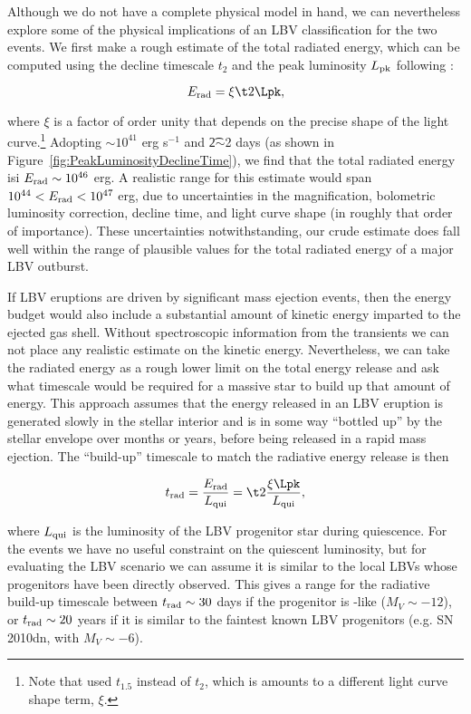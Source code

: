 Although we do not have a complete physical model in hand, we can
nevertheless explore some of the physical implications of an LBV
classification for the two \spock events.  We first make a rough
estimate of the total radiated energy, which can be computed using the
decline timescale $t_2$ and the peak luminosity $L_{\rm pk}$ following
\citet{Smith:2011b}:

\begin{equation}
  \label{eqn:Erad}
  E_{\rm rad} = \xi \t2 \Lpk,
\end{equation}

\noindent where $\xi$ is a factor of order unity that depends on the
precise shape of the light curve.\footnote{Note that
  \citet{Smith:2011b} used $t_{1.5}$ instead of $t_2$, which is
  amounts to a different light curve shape term, $\xi$.}  Adopting
\Lpk$\sim10^{41}$ erg s$^{-1}$ and \t2$\sim$2 days (as shown in
Figure~\ref{fig:PeakLuminosityDeclineTime}), we find that the total
radiated energy isi $E_{\rm rad}\sim10^{46}$ erg.  A realistic range
for this estimate would span $10^{44}<E_{\rm rad}<10^{47}$ erg, due to
uncertainties in the magnification, bolometric luminosity correction,
decline time, and light curve shape (in roughly that order of
importance). These uncertainties notwithstanding, our crude estimate
does fall well within the range of plausible values for the total
radiated energy of a major LBV outburst.

If LBV eruptions are driven by significant mass ejection events, then
the energy budget would also include a substantial amount of kinetic
energy imparted to the ejected gas shell. Without spectroscopic
information from the \spock transients we can not place any realistic
estimate on the kinetic energy. Nevertheless, we can take the radiated
energy as a rough lower limit on the total energy release and ask what
timescale would be required for a massive star to build up that amount
of energy. This approach assumes that the energy released in an LBV
eruption is generated slowly in the stellar interior and is in some
way ``bottled up'' by the stellar envelope over months or years,
before being released in a rapid mass ejection.  The ``build-up''
timescale to match the radiative energy release is then

\begin{equation}
  \label{eqn:trad}
t_{\rm rad} = \frac{E_{\rm rad}}{L_{\rm qui}} = \t2 \frac{\xi\Lpk}{L_{\rm qui}},
\end{equation}

\noindent where $L_{\rm qui}$ is the luminosity of the LBV progenitor
star during quiescence. For the \spock events we have no useful
constraint on the quiescent luminosity, but for evaluating the LBV
scenario we can assume it is similar to the local LBVs whose
progenitors have been directly observed.  This gives a range for the
radiative build-up timescale between $t_{\rm rad}\sim30$ days if the
progenitor is \etacar-like ($M_V\sim-12$), or $t_{\rm rad}\sim20$
years if it is similar to the faintest known LBV progenitors (e.g. SN
2010dn, with $M_V\sim-6$).  


